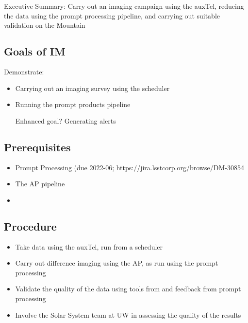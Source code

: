 
Executive Summary:
Carry out an imaging campaign using the auxTel, reducing the data using the prompt processing pipeline, and
carrying out suitable validation on the Mountain

\subsection{Goals of IM}
Demonstrate:
\begin{itemize}
\item Carrying out an imaging survey using the scheduler
\item Running the prompt products pipeline
\item [Enhanced goal?] Generating alerts
\end{itemize}

\subsection{Prerequisites}
\begin{itemize}
\item Prompt Processing (due 2022-06; \href{DM-30854}{https://jira.lsstcorp.org/browse/DM-30854}
\item The AP pipeline
\item {}
\end{itemize}

\subsection{Procedure}
\begin{itemize}
\item Take data using the auxTel, run from a scheduler
\item Carry out difference imaging using the AP, as run using the prompt processing
\item Validate the quality of the data using tools from  and feedback from prompt processing
\item Involve the Solar System team at UW in assessing the quality of the results
\end{itemize}
